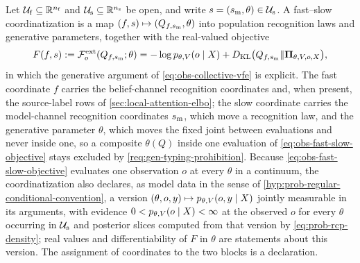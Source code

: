 Let $\mathcal U_{\rm f}\subseteq\mathbb R^{n_{\rm f}}$ and
$\mathcal U_{\rm s}\subseteq\mathbb R^{n_{\rm s}}$ be open, and write
$s=(s_{\rm m},\theta)\in\mathcal U_{\rm s}$. A fast--slow coordinatization is a
map $(f,s)\mapsto(Q_{f,s_{\rm m}},\theta)$ into population recognition laws and
generative parameters, together with the real-valued objective
\begin{equation}
F(f,s):=\mathcal F^{\mathrm{ext}}_o(Q_{f,s_{\rm m}};\theta)
=-\log p_{\theta,V}(o\mid X)
+D_{\mathrm{KL}}\bigl(Q_{f,s_{\rm m}}\Vert\boldsymbol\Pi_{\theta,V,o,X}\bigr),
\label{eq:obs-fast-slow-objective}
\end{equation}
in which the generative argument of \eqref{eq:obs-collective-vfe} is explicit. The
fast coordinate $f$ carries the belief-channel recognition coordinates and, when
present, the source-label rows of \cref{sec:local-attention-elbo}; the slow
coordinate carries the model-channel recognition coordinates $s_{\rm m}$, which move
a recognition law, and the generative parameter $\theta$, which moves the fixed joint
between evaluations and never inside one, so a composite $\theta(Q)$ inside one
evaluation of \eqref{eq:obs-fast-slow-objective} stays excluded by
\cref{req:gen-typing-prohibition}. Because \eqref{eq:obs-fast-slow-objective}
evaluates one observation $o$ at every $\theta$ in a continuum, the coordinatization
also declares, as model data in the sense of
\cref{hyp:prob-regular-conditional-convention}, a version
$(\theta,o,y)\mapsto p_{\theta,V}(o,y\mid X)$ jointly measurable in its arguments,
with evidence $0<p_{\theta,V}(o\mid X)<\infty$ at the observed $o$ for every
$\theta$ occurring in $\mathcal U_{\rm s}$ and posterior slices computed from that
version by \eqref{eq:prob-rcp-density}; real values and differentiability of $F$
in $\theta$ are statements about this version. The assignment of coordinates to
the two blocks is a declaration.

